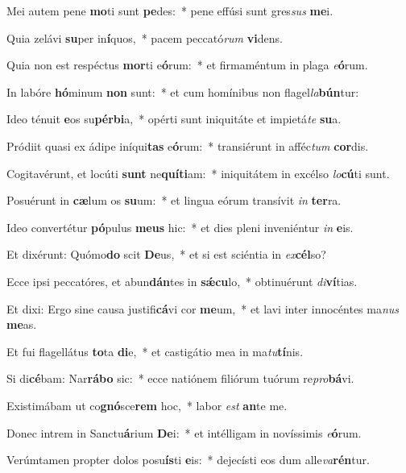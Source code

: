\item Mei autem pene \textbf{mo}ti sunt \textbf{pe}des:~* pene effúsi sunt gres\textit{sus} \textbf{me}i.
\item Quia zelávi \textbf{su}per in\textbf{í}quos,~* pacem peccató\textit{rum} \textbf{vi}dens.
\item Quia non est respéctus \textbf{mor}ti e\textbf{ó}rum:~* et firmaméntum in plaga \textit{e}\textbf{ó}rum.
\item In labóre \textbf{hó}minum \textbf{non} sunt:~* et cum homínibus non flagel\textit{la}\textbf{bún}tur:
\item Ideo ténuit \textbf{e}os su\textbf{pér}\textbf{bi}a,~* opérti sunt iniquitáte et impietá\textit{te} \textbf{su}a.
\item Pródiit quasi ex ádipe iníqui\textbf{tas} e\textbf{ó}rum:~* transiérunt in afféc\textit{tum} \textbf{cor}dis.
\item Cogitavérunt, et locúti \textbf{sunt} ne\textbf{quí}\textbf{ti}am:~* iniquitátem in excélso \textit{lo}\textbf{cú}ti sunt.
\item Posuérunt in \textbf{cæ}lum os \textbf{su}um:~* et lingua eórum transívit \textit{in} \textbf{ter}ra.
\item Ideo convertétur \textbf{pó}pulus \textbf{me}\textbf{us} hic:~* et dies pleni inveniéntur \textit{in} \textbf{e}is.
\item Et dixérunt: Quómo\textbf{do} scit \textbf{De}us,~* et si est sciéntia in \textit{ex}\textbf{cél}so?
\item Ecce ipsi peccatóres, et abun\textbf{dán}tes in \textbf{sǽ}\textbf{cu}lo,~* obtinuérunt \textit{di}\textbf{ví}tias.
\item Et dixi: Ergo sine causa justifi\textbf{cá}vi cor \textbf{me}um,~* et lavi inter innocéntes ma\textit{nus} \textbf{me}as.
\item Et fui flagellátus \textbf{to}ta \textbf{di}e,~* et castigátio mea in ma\textit{tu}\textbf{tí}nis.
\item Si di\textbf{cé}bam: Nar\textbf{rá}\textbf{bo} sic:~* ecce natiónem filiórum tuórum re\textit{pro}\textbf{bá}vi.
\item Existimábam ut co\textbf{gnó}sce\textbf{rem} hoc,~* labor \textit{est} \textbf{an}te me.
\item Donec intrem in Sanctu\textbf{á}rium \textbf{De}i:~* et intélligam in novíssimis \textit{e}\textbf{ó}rum.
\item Verúmtamen propter dolos posu\textbf{ís}ti \textbf{e}is:~* dejecísti eos dum alle\textit{va}\textbf{rén}tur.
